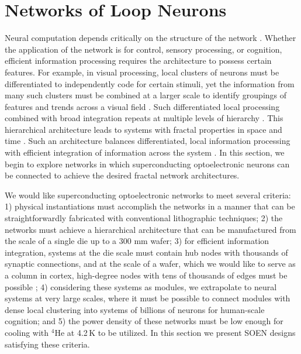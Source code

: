 \documentclass[twocolumn]{article}
\begin{document}
\section{\label{sec:networks}Networks of Loop Neurons}
Neural computation depends critically on the structure of the network \cite{spto2000}. Whether the application of the network is for control, sensory processing, or cognition, efficient information processing requires the architecture to possess certain features. For example, in visual processing, local clusters of neurons must be differentiated to independently code for certain stimuli, yet the information from many such clusters must be combined at a larger scale to identify groupings of features and trends across a visual field \cite{haah2017}. Such differentiated local processing combined with broad integration repeats at multiple levels of hierarchy \cite{stsa2000,budr2004}. This hierarchical architecture leads to systems with fractal properties in space and time \cite{bu2006,busp2009}. Such an architecture balances differentiated, local information processing with efficient integration of information across the system \cite{to2004}. In this section, we begin to explore networks in which superconducting optoelectronic neurons can be connected to achieve the desired fractal network architectures.

We would like superconducting optoelectronic networks to meet several criteria: 1) physical instantiations must accomplish the networks in a manner that can be straightforwardly fabricated with conventional lithographic techniques; 2) the networks must achieve a hierarchical architecture that can be manufactured from the scale of a single die up to a 300 mm wafer; 3) for efficient information integration, systems at the die scale must contain hub nodes with thousands of synaptic connections, and at the scale of a wafer, which we would like to serve as a column in cortex, high-degree nodes with tens of thousands of edges must be possible \cite{sh2018_ICRC}; 4) considering these systems as modules, we extrapolate to neural systems at very large scales, where it must be possible to connect modules with dense local clustering into systems of billions of neurons for human-scale cognition; and 5) the power density of these networks must be low enough for cooling with $^4$He at 4.2\,K to be utilized. In this section we present SOEN designs satisfying these criteria.
	
\end{document}
